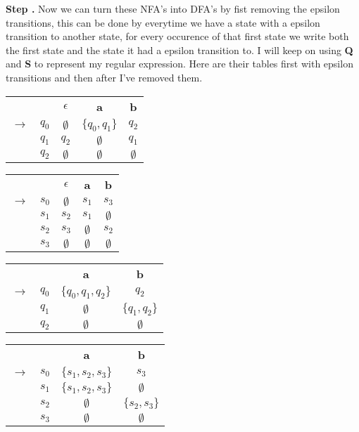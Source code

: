 \documentclass{article}
\newcounter{step}
\newcommand\Step{%
  \stepcounter{step}%
  \textbf{Step \thestep. }%
}
\begin{document}
\newpage
\Step Now we can turn these NFA's into DFA's by fist removing the epsilon transitions, this can be done
by everytime we have a state with a epsilon transition to another state, for every occurence of that first 
state we write both the first state and the state it had a epsilon transition to. I will keep on using
\textbf{Q} and \textbf{S} to represent my regular expression. Here are their tables first with epsilon 
transitions and then after I've removed them.

\begin{table}[h!]
  \centering
  \begin{tabular}{c c c c c}
         &&\textbf{$\epsilon$}&\textbf{a}&\textbf{b}\\ 
    $\to$    & $q_0$ & $\emptyset$ & $\{q_0, q_1\}$ & $q_2$\\
          & $q_1$ & $q_2$ & $\emptyset$ & $q_1$\\
\hfill *  & $q_2$ & $\emptyset$ & $\emptyset$ & $\emptyset$\\ [0.5ex]
\end{tabular} 
\begin{tabular}{|c c c c c}
            &&\textbf{$\epsilon$}&\textbf{a}&\textbf{b}\\ 
 $\to$       & $s_0$ & $\emptyset$ & $s_1$ & $s_3$\\
             & $s_1$ & $s_2$ & $s_1$ & $\emptyset$\\
             & $s_2$ & $s_3$ & $\emptyset$ & $s_2$\\
\hfill    *  & $s_3$ & $\emptyset$ & $\emptyset$ & $\emptyset$\\ [0.5ex]
\end{tabular}
\end{table}

\begin{table}[h!]
  \centering
  \begin{tabular}{c c c c}
         &&\textbf{a}&\textbf{b}\\ 
    $\to$    & $q_0$ & $\{q_0, q_1, q_2\}$ & $q_2$\\
             & $q_1$ & $\emptyset$ & $\{q_1,q_2\}$\\
\hfill *     & $q_2$ & $\emptyset$ & $\emptyset$\\ [0.5ex]
\end{tabular} 
\begin{tabular}{|c c c c}
            &&\textbf{a}&\textbf{b}\\ 
  $\to$       & $s_0$ & $\{s_1,s_2,s_3\}$ & $s_3$\\
             & $s_1$ & $\{s_1,s_2,s_3\}$ & $\emptyset$\\
             & $s_2$ & $\emptyset$ & $\{s_2,s_3\}$\\
\hfill    *  & $s_3$ & $\emptyset$ & $\emptyset$\\ [0.5ex]
\end{tabular}
\end{table}
\end{document}
